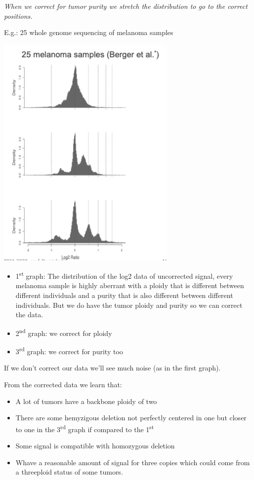 \emph{{When we correct for tumor purity we stretch the distribution to go to the
correct positions.}}

E.g.: 25 whole genome sequencing of melanoma samples

\includegraphics[width=3.42917in,height=4.56111in]{image8.png}\\

\begin{itemize}
\item
  1\textsuperscript{st} graph: The distribution of the log2 data of uncorrected
  signal, every melanoma sample is highly aberrant with a ploidy that is
  different between different individuals and a purity that is also different
  between different individuals. But we do have the tumor ploidy and purity so
  we can correct the data.
\item
  2\textsuperscript{nd} graph: we correct for ploidy
\item
  3\textsuperscript{rd} graph: we correct for purity too
\end{itemize}

If we don't correct our data we'll see much noise (as in the first graph).

From the corrected data we learn that:

\begin{itemize}
\item
  A lot of tumors have a backbone ploidy of two
\item
  There are some hemyzigous deletion not perfectly centered in one but closer to
  one in the 3\textsuperscript{rd} graph if compared to the
  1\textsuperscript{st}
\item
  Some signal is compatible with homozygous deletion
\item
  Whave a reasonable amount of signal for three copies which could come from a
  threeploid status of some tumors.
\end{itemize}

